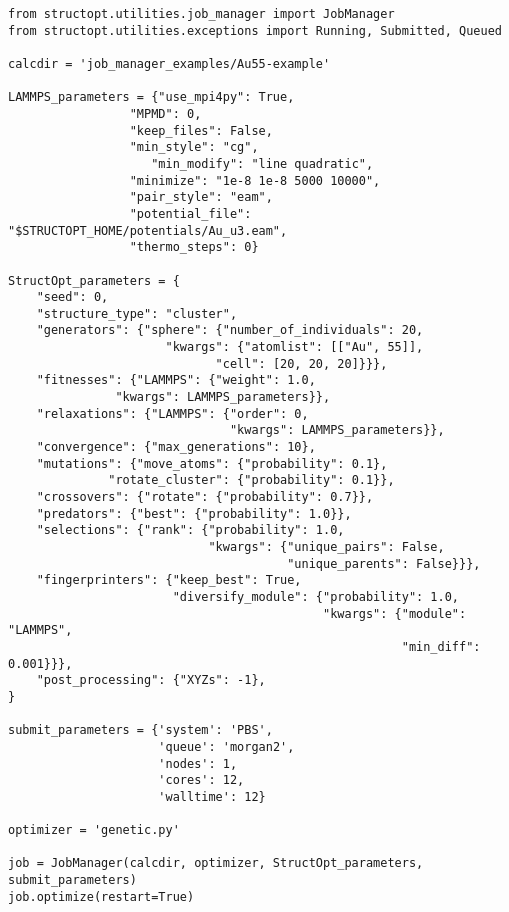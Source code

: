 \documentclass[11pt]{article}
\begin{document}
\begin{verbatim}
from structopt.utilities.job_manager import JobManager
from structopt.utilities.exceptions import Running, Submitted, Queued

calcdir = 'job_manager_examples/Au55-example'

LAMMPS_parameters = {"use_mpi4py": True,
	             "MPMD": 0,
	             "keep_files": False,
	             "min_style": "cg",
                    "min_modify": "line quadratic",
	             "minimize": "1e-8 1e-8 5000 10000",
	             "pair_style": "eam",
	             "potential_file": "$STRUCTOPT_HOME/potentials/Au_u3.eam",
	             "thermo_steps": 0}

StructOpt_parameters = {
    "seed": 0,
    "structure_type": "cluster",
    "generators": {"sphere": {"number_of_individuals": 20,
		              "kwargs": {"atomlist": [["Au", 55]],
			                 "cell": [20, 20, 20]}}},
    "fitnesses": {"LAMMPS": {"weight": 1.0,
	           "kwargs": LAMMPS_parameters}},
    "relaxations": {"LAMMPS": {"order": 0,
                               "kwargs": LAMMPS_parameters}},
    "convergence": {"max_generations": 10},
    "mutations": {"move_atoms": {"probability": 0.1},
	          "rotate_cluster": {"probability": 0.1}},
    "crossovers": {"rotate": {"probability": 0.7}},
    "predators": {"best": {"probability": 1.0}},
    "selections": {"rank": {"probability": 1.0,
                            "kwargs": {"unique_pairs": False,
                                       "unique_parents": False}}},
    "fingerprinters": {"keep_best": True,
                       "diversify_module": {"probability": 1.0,
                                            "kwargs": {"module": "LAMMPS",
                                                       "min_diff": 0.001}}},
    "post_processing": {"XYZs": -1},
}

submit_parameters = {'system': 'PBS',
                     'queue': 'morgan2',
                     'nodes': 1,
                     'cores': 12,
                     'walltime': 12}

optimizer = 'genetic.py'

job = JobManager(calcdir, optimizer, StructOpt_parameters, submit_parameters)
job.optimize(restart=True)
\end{verbatim}
\end{document}
